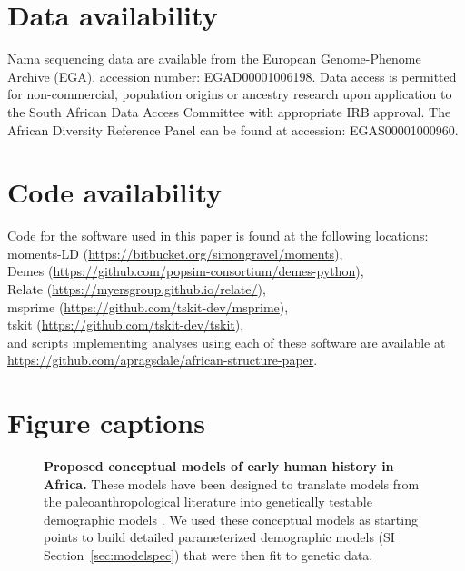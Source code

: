 \documentclass[]{article}
\begin{document}
\section*{Data availability}

Nama sequencing data are available from the European Genome-Phenome Archive
(EGA), accession number: EGAD00001006198. Data access is permitted for non-commercial, 
population origins or ancestry research
upon application to the South African Data Access Committee with appropriate IRB approval. 
The African Diversity Reference Panel can be found at accession: EGAS00001000960.

\section*{Code availability}

Code for the software used in this paper is found at the following locations:\\
moments-LD (\url{https://bitbucket.org/simongravel/moments}),\\
Demes (\url{https://github.com/popsim-consortium/demes-python}),\\
Relate (\url{https://myersgroup.github.io/relate/}),\\
msprime (\url{https://github.com/tskit-dev/msprime}),\\
tskit (\url{https://github.com/tskit-dev/tskit}),\\
and scripts implementing analyses using each of these software are available at\\
\url{https://github.com/apragsdale/african-structure-paper}.

\break

\section*{Figure captions}

\begin{figure}[ht]
    \centering
    \caption{
        \textbf{Proposed conceptual models of early human history in Africa.}
        These models have been designed to translate models from the 
        paleoanthropological literature into genetically testable demographic
        models \citep{Henn2018-rf}.
        We used these conceptual models as starting points to build detailed
        parameterized demographic models (SI Section~\ref{sec:modelspec})
        that were then fit to genetic data. 
    }
    \label{fig:proposed-models}
\end{figure}
\end{document}
